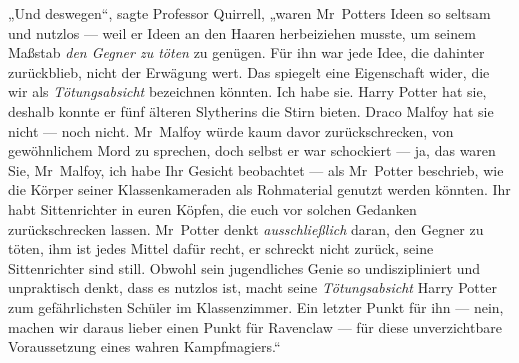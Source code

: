 „Und deswegen“, sagte Professor Quirrell, „waren Mr~Potters Ideen so seltsam und nutzlos — weil er Ideen an den Haaren herbeiziehen musste, um seinem Maßstab \emph{den Gegner zu töten} zu genügen. Für ihn war jede Idee, die dahinter zurückblieb, nicht der Erwägung wert. Das spiegelt eine Eigenschaft wider, die wir als \emph{Tötungsabsicht} bezeichnen könnten. Ich habe sie. Harry Potter hat sie, deshalb konnte er fünf älteren Slytherins die Stirn bieten. Draco Malfoy hat sie nicht — noch nicht. Mr~Malfoy würde kaum davor zurückschrecken, von gewöhnlichem Mord zu sprechen, doch selbst er war schockiert — ja, das waren Sie, Mr~Malfoy, ich habe Ihr Gesicht beobachtet — als Mr~Potter beschrieb, wie die Körper seiner Klassenkameraden als Rohmaterial genutzt werden könnten. Ihr habt Sittenrichter in euren Köpfen, die euch vor solchen Gedanken zurückschrecken lassen. Mr~Potter denkt \emph{ausschließlich} daran, den Gegner zu töten, ihm ist jedes Mittel dafür recht, er schreckt nicht zurück, seine Sittenrichter sind still. Obwohl sein jugendliches Genie so undiszipliniert und unpraktisch denkt, dass es nutzlos ist, macht seine \emph{Tötungsabsicht} Harry Potter zum gefährlichsten Schüler im Klassenzimmer. Ein letzter Punkt für ihn — nein, machen wir daraus lieber einen Punkt für Ravenclaw — für diese unverzichtbare Voraussetzung eines wahren Kampfmagiers.“


